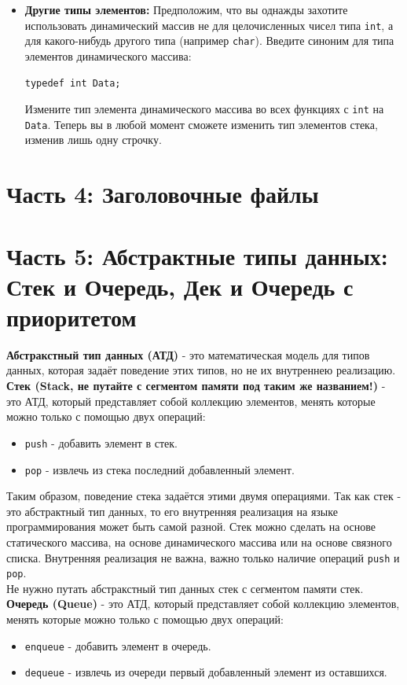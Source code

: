 \documentclass{article}
\begin{document}
\begin{itemize}
\item \textbf{Другие типы элементов:} Предположим, что вы однажды захотите использовать динамический массив не для целочисленных чисел типа \texttt{int}, а для какого-нибудь другого типа (например \texttt{char}). Введите синоним для типа элементов динамического массива:
\begin{verbatim}
typedef int Data;
\end{verbatim}
Измените тип элемента динамического массива во всех функциях с \texttt{int} на \texttt{Data}. Теперь вы в любой момент сможете изменить тип элементов стека, изменив лишь одну строчку.
\end{itemize}


\newpage
\section*{Часть 4: Заголовочные файлы}


\newpage
\section*{Часть 5: Абстрактные типы данных: Стек и Очередь, Дек и Очередь с приоритетом}
\textbf{Абстракстный тип данных (АТД)} - это математическая модель для типов данных, которая задаёт поведение этих типов, но не их внутреннею реализацию.\\

\textbf{Стек (Stack, не путайте с сегментом памяти под таким же названием!)} - это АТД, который представляет собой коллекцию элементов, менять которые можно только с помощью двух операций:
\begin{itemize}
\item \texttt{push} - добавить элемент в стек.
\item \texttt{pop} - извлечь из стека последний добавленный элемент.
\end{itemize}
Таким образом, поведение стека задаётся этими двумя операциями. Так как стек - это абстрактный тип данных, то его внутренняя реализация на языке программирования может быть самой разной. Стек можно сделать на основе статического массива, на основе динамического массива или на основе связного списка. Внутренняя реализация не важна, важно только наличие операций \texttt{push} и \texttt{pop}. \\
Не нужно путать абстракстный тип данных стек с сегментом памяти стек.\\

\textbf{Очередь (Queue)} - это АТД, который представляет собой коллекцию элементов, менять которые можно только с помощью двух операций:
\begin{itemize}
\item \texttt{enqueue} - добавить элемент в очередь.
\item \texttt{dequeue} - извлечь из очереди первый добавленный элемент из оставшихся.
\end{itemize}
\end{document}
